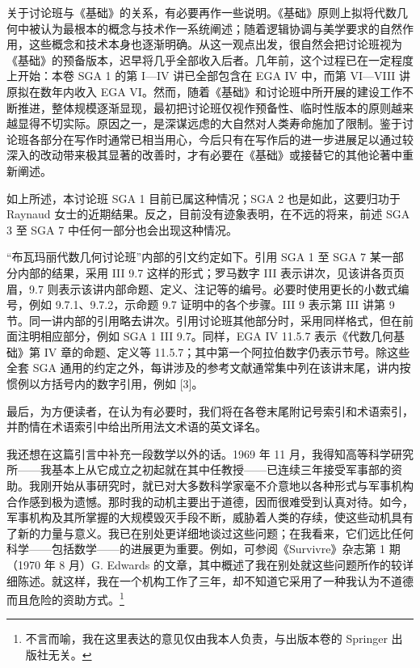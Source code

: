 关于讨论班与《基础》的关系，有必要再作一些说明。《基础》原则上拟将代数几何中被认为最根本的概念与技术作一系统阐述；随着逻辑协调与美学要求的自然作用，这些概念和技术本身也逐渐明确。从这一观点出发，很自然会把讨论班视为《基础》的预备版本，迟早将几乎全部收入后者。几年前，这个过程已在一定程度上开始：本卷 SGA 1 的第 I—IV 讲已全部包含在 EGA IV 中，而第 VI—VIII 讲原拟在数年内收入 EGA VI。然而，随着《基础》和讨论班中所开展的建设工作不断推进，整体规模逐渐显现，最初把讨论班仅视作预备性、临时性版本的原则越来越显得不切实际。原因之一，是深谋远虑的大自然对人类寿命施加了限制。鉴于讨论班各部分在写作时通常已相当用心，今后只有在写作后的进一步进展足以通过较深入的改动带来极其显著的改善时，才有必要在《基础》或接替它的其他论著中重新阐述。

如上所述，本讨论班 SGA 1 目前已属这种情况；SGA 2 也是如此，这要归功于 Raynaud 女士的近期结果。反之，目前没有迹象表明，在不远的将来，前述 SGA 3 至 SGA 7 中任何一部分也会出现这种情况。

“布瓦玛丽代数几何讨论班”内部的引文约定如下。引用 SGA 1 至 SGA 7 某一部分内部的结果，采用 III 9.7 这样的形式；罗马数字 III 表示讲次，见该讲各页页眉，9.7 则表示该讲内部命题、定义、注记等的编号。必要时使用更长的小数式编号，例如 9.7.1、9.7.2，示命题 9.7 证明中的各个步骤。III 9 表示第 III 讲第 9 节。同一讲内部的引用略去讲次。引用讨论班其他部分时，采用同样格式，但在前面注明相应部分，例如 SGA 1 III 9.7。同样，EGA IV 11.5.7 表示《代数几何基础》第 IV 章的命题、定义等 11.5.7；其中第一个阿拉伯数字仍表示节号。除这些全套 SGA 通用的约定之外，每讲涉及的参考文献通常集中列在该讲末尾，讲内按惯例以方括号内的数字引用，例如 [3]。

最后，为方便读者，在认为有必要时，我们将在各卷末尾附记号索引和术语索引，并酌情在术语索引中给出所用法文术语的英文译名。

我还想在这篇引言中补充一段数学以外的话。1969 年 11 月，我得知高等科学研究所——我基本上从它成立之初起就在其中任教授——已连续三年接受军事部的资助。我刚开始从事研究时，就已对大多数科学家毫不介意地以各种形式与军事机构合作感到极为遗憾。那时我的动机主要出于道德，因而很难受到认真对待。如今，军事机构及其所掌握的大规模毁灭手段不断，威胁着人类的存续，使这些动机具有了新的力量与意义。我已在别处更详细地谈过这些问题；在我看来，它们远比任何科学——包括数学——的进展更为重要。例如，可参阅《Survivre》杂志第 1 期（1970 年 8 月）G. Edwards 的文章，其中概述了我在别处就这些问题所作的较详细陈述。就这样，我在一个机构工作了三年，却不知道它采用了一种我认为不道德而且危险的资助方式。\footnote{不言而喻，我在这里表达的意见仅由我本人负责，与出版本卷的 Springer 出版社无关。}

